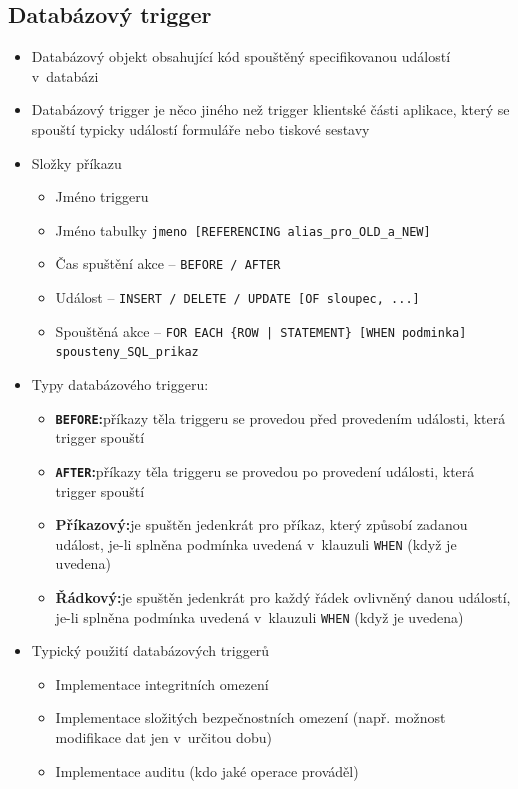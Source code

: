 \documentclass[a4paper,10pt]{article}
\newcommand{\pojem}[2]{\item \textbf{#1:}\quad #2}
\begin{document}
    \subsection{Databázový trigger}
      \begin{itemize}
        \item Databázový objekt obsahující kód spouštěný specifikovanou událostí v~databázi
        \item Databázový trigger je něco jiného než trigger klientské části aplikace, který se spouští typicky událostí formuláře nebo tiskové sestavy
        \item Složky příkazu
        \begin{itemize}
          \item Jméno triggeru
          \item Jméno tabulky \texttt{jmeno [REFERENCING alias\_pro\_OLD\_a\_NEW]}
          \item Čas spuštění akce -- \texttt{BEFORE / AFTER}
          \item Událost -- \texttt{INSERT / DELETE / UPDATE [OF sloupec, ...]}
          \item Spouštěná akce -- \texttt{FOR EACH \{ROW | STATEMENT\} [WHEN podminka] spousteny\_SQL\_prikaz}
        \end{itemize}
        \item Typy databázového triggeru:
        \begin{itemize}
          \pojem{\texttt{BEFORE}}{příkazy těla triggeru se provedou před provedením události, která trigger spouští}
          \pojem{\texttt{AFTER}}{příkazy těla triggeru se provedou po provedení události, která trigger spouští}
          \pojem{Příkazový}{je spuštěn jedenkrát pro příkaz, který způsobí zadanou událost, je-li splněna podmínka uvedená v~klauzuli \texttt{WHEN} (když je uvedena)}
          \pojem{Řádkový}{je spuštěn jedenkrát pro každý řádek ovlivněný danou událostí, je-li splněna podmínka uvedená v~klauzuli \texttt{WHEN} (když je uvedena)}
        \end{itemize}
        \item Typický použití databázových triggerů
        \begin{itemize}
          \item Implementace integritních omezení
          \item Implementace složitých bezpečnostních omezení (např. možnost modifikace dat jen v~určitou dobu)
          \item Implementace auditu (kdo jaké operace prováděl)

\end{itemize}
\end{itemize}
\end{document}
